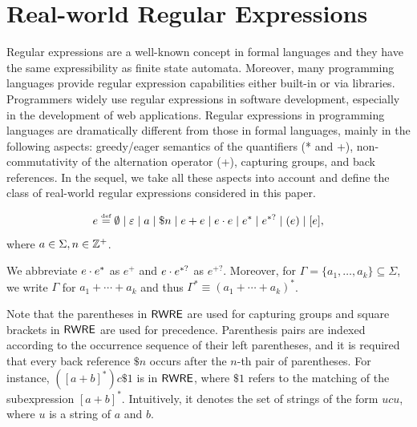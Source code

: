 
\section{Real-world Regular Expressions}
Regular expressions are a well-known concept in formal languages and they have the same expressibility as finite state automata. Moreover, many programming languages provide regular expression capabilities either built-in or via libraries. Programmers widely use regular expressions in software development, especially in the development of web applications. Regular expressions in programming languages are dramatically different from those in formal languages, mainly in the following aspects: greedy/eager semantics of the quantifiers (* and +), non-commutativity of the alternation operator (+), capturing groups, and back references. In the sequel, we take all these aspects into account and define the class of real-world regular expressions considered in this paper. 
  
\begin{definition}
  	\[e \eqdef \emptyset \mid \varepsilon \mid a \mid \$n \mid e + e \mid e \concat e \mid e^* \mid e^{*?} \mid (e)\mid [e], \]
  	where $a \in \Sigma, n \in \mathbb{Z}^+$. 
\end{definition}
We abbreviate $e \cdot e^*$ as $e^+$ and $e \cdot e^{*?}$ as $e^{+?}$. Moreover, for $\Gamma = \{a_1, \ldots, a_k\}\subseteq \Sigma$, we write $\Gamma$ for  $a_1 + \cdots + a_k$ and thus  $\Gamma^\ast \equiv (a_1 + \cdots + a_k)^\ast$. 

Note that the parentheses in ${\sf RWRE}$ are used for capturing groups and square brackets in ${\sf RWRE}$ are used for precedence. 
%
Parenthesis pairs are indexed according to the occurrence sequence of their left parentheses, and it is required that every back reference $\$ n$ occurs  %
after the $n$-th pair of parentheses. For instance, $([a+b]^*) c \$1$ is in ${\sf RWRE}$, where $\$1$ refers to the matching of the subexpression $[a+b]^*$. Intuitively, it denotes the set of strings of the form $u c u$, where $u$ is a string of $a$ and $b$. 
  
